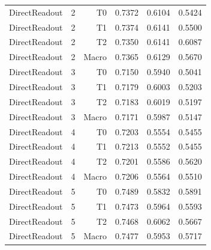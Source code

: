 \begin{table}[t]
\begin{tabular}{llrrrr}
DirectReadout & 2 & T0 & 0.7372 & 0.6104 & 0.5424 \\
DirectReadout & 2 & T1 & 0.7374 & 0.6141 & 0.5500 \\
DirectReadout & 2 & T2 & 0.7350 & 0.6141 & 0.6087 \\
DirectReadout & 2 & Macro & 0.7365 & 0.6129 & 0.5670 \\
DirectReadout & 3 & T0 & 0.7150 & 0.5940 & 0.5041 \\
DirectReadout & 3 & T1 & 0.7179 & 0.6003 & 0.5203 \\
DirectReadout & 3 & T2 & 0.7183 & 0.6019 & 0.5197 \\
DirectReadout & 3 & Macro & 0.7171 & 0.5987 & 0.5147 \\
DirectReadout & 4 & T0 & 0.7203 & 0.5554 & 0.5455 \\
DirectReadout & 4 & T1 & 0.7213 & 0.5552 & 0.5455 \\
DirectReadout & 4 & T2 & 0.7201 & 0.5586 & 0.5620 \\
DirectReadout & 4 & Macro & 0.7206 & 0.5564 & 0.5510 \\
DirectReadout & 5 & T0 & 0.7489 & 0.5832 & 0.5891 \\
DirectReadout & 5 & T1 & 0.7473 & 0.5964 & 0.5593 \\
DirectReadout & 5 & T2 & 0.7468 & 0.6062 & 0.5667 \\
DirectReadout & 5 & Macro & 0.7477 & 0.5953 & 0.5717 \\
\bottomrule
\end{tabular}
\end{table}
